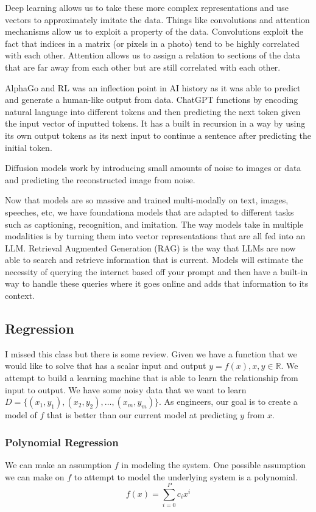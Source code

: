 \documentclass[11pt]{article}
\begin{document}
Deep learning allows us to take these more complex representations and use vectors to approximately imitate the data.
Things like convolutions and attention mechanisms allow us to exploit a property of the data.
Convolutions exploit the fact that indices in a matrix (or pixels in a photo) tend to be highly correlated with each other.
Attention allows us to assign a relation to sections of the data that are far away from each other but are still correlated with each other.

AlphaGo and RL was an inflection point in AI history as it was able to predict and generate a human-like output from data.
ChatGPT functions by encoding natural language into different tokens and then predicting the next token given the input vector of inputted tokens.
It has a built in recursion in a way by using its own output tokens as its next input to continue a sentence after predicting the initial token.

Diffusion models work by introducing small amounts of noise to images or data and predicting the reconstructed image from noise.

Now that models are so massive and trained multi-modally on text, images, speeches, etc, we have foundationa models that are adapted to different tasks such as captioning, recognition, and imitation.
The way models take in multiple modalities is by turning them into vector representations that are all fed into an LLM.
Retrieval Augmented Generation (RAG) is the way that LLMs are now able to search and retrieve information that is current.
Models will estimate the necessity of querying the internet based off your prompt and then have a built-in way to handle these queries where it goes online and adds that information to its context.

\subsection{Regression}
I missed this class but there is some review.
Given we have a function that we would like to solve that has a scalar input and output $y=f(x), x,y \in \mathbb{R}$.
We attempt to build a learning machine that is able to learn the relationship from input to output.
We have some noisy data that we want to learn $D = \{ (x_1, y_1), (x_2, y_2), \dots, (x_m, y_m ) \}$.
As engineers, our goal is to create a model of $f$ that is better than our current model at predicting $y$ from $x$.

\subsubsection{Polynomial Regression}
We can make an assumption $f$ in modeling the system.
One possible assumption we can make on $f$ to attempt to model the underlying system is a polynomial.
\begin{equation}
    f(x) = \sum_{i=0}^{P} c_i x^i
\end{equation}
\end{document}
